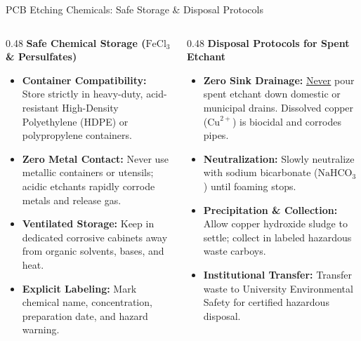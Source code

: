 \begin{frame}{PCB Etching Chemicals: Safe Storage \& Disposal Protocols}
    \begin{columns}[T]
        \begin{column}{0.48\textwidth}
            \textbf{Safe Chemical Storage ($\text{FeCl}_3$ \& Persulfates)}
            \begin{itemize}
                \item \textbf{Container Compatibility:} Store strictly in heavy-duty, acid-resistant High-Density Polyethylene (HDPE) or polypropylene containers.
                \item \textbf{Zero Metal Contact:} Never use metallic containers or utensils; acidic etchants rapidly corrode metals and release gas.
                \item \textbf{Ventilated Storage:} Keep in dedicated corrosive cabinets away from organic solvents, bases, and heat.
                \item \textbf{Explicit Labeling:} Mark chemical name, concentration, preparation date, and hazard warning.
            \end{itemize}
        \end{column}
        \begin{column}{0.48\textwidth}
            \textbf{Disposal Protocols for Spent Etchant}
            \begin{itemize}
                \item \textbf{Zero Sink Drainage:} \underline{Never} pour spent etchant down domestic or municipal drains. Dissolved copper ($\text{Cu}^{2+}$) is biocidal and corrodes pipes.
                \item \textbf{Neutralization:} Slowly neutralize with sodium bicarbonate ($\text{NaHCO}_3$) until foaming stops.
                \item \textbf{Precipitation \& Collection:} Allow copper hydroxide sludge to settle; collect in labeled hazardous waste carboys.
                \item \textbf{Institutional Transfer:} Transfer waste to University Environmental Safety for certified hazardous disposal.
            \end{itemize}
        \end{column}
    \end{columns}
\end{frame}
